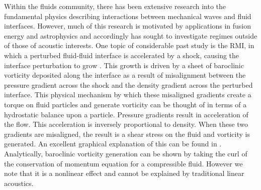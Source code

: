 Within the fluids community, there has been extensive research into
the fundamental physics describing interactions between mechanical
waves and fluid interfaces. However, much of this research is
motivated by applications in fusion energy and astrophysics and
accordingly has sought to investigate regimes outside of those of
acoustic interests. One topic of considerable past study is the
\ac{RMI}, in which a perturbed fluid-fluid interface is accelerated by
a shock, causing the interface perturbation to grow
\citep{Brouillette2002,Drake2006}. This growth is driven by a sheet of
baroclinic vorticity deposited along the interface as a result of
misalignment between the pressure gradient across the shock and the
density gradient across the perturbed interface. This physical
mechanism by which these misaligned gradients create a torque on fluid
particles and generate vorticity can be thought of in terms of a
hydrostatic balance upon a particle. Pressure gradients result in
acceleration of the flow. This acceleration is inversely proportional
to density. When these two gradients are misaligned, the result is a
shear stress on the fluid and vorticity is generated. An excellent
graphical explanation of this can be found in \cite{Heifetz2015}.
Analytically, baroclinic vorticity generation can be shown by taking
the curl of the conservation of momentum equation for a compressible
fluid. However we note that it is a nonlinear effect and cannot be
explained by traditional linear acoustics.

